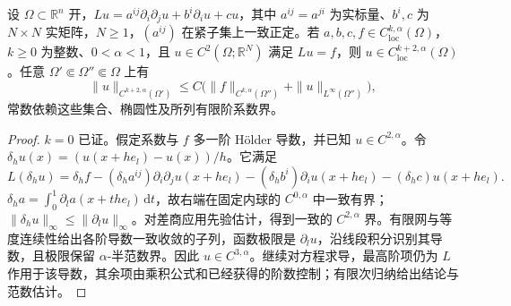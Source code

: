 \begin{corollary}\label{g3:cor:schauder-higher-bootstrap}
	设 \(\Omega\subset\mathbb R^n\) 开，\(Lu=a^{ij}\partial_i\partial_ju+b^i\partial_i u+cu\)，其中 \(a^{ij}=a^{ji}\) 为实标量、\(b^i,c\) 为 \(N\times N\) 实矩阵，\(N\ge1\)，\((a^{ij})\) 在紧子集上一致正定。若 \(a,b,c,f\in C^{k,\alpha}_{\mathrm{loc}}(\Omega)\)，\(k\ge0\) 为整数、\(0<\alpha<1\)，且 \(u\in C^2(\Omega;\mathbb R^N)\) 满足 \(Lu=f\)，则 \(u\in C^{k+2,\alpha}_{\mathrm{loc}}(\Omega)\)。任意 \(\Omega'\Subset\Omega''\Subset\Omega\) 上有
	\[
		\|u\|_{C^{k+2,\alpha}(\Omega')}
		\le C\bigl(\|f\|_{C^{k,\alpha}(\Omega'')}+\|u\|_{L^\infty(\Omega'')}\bigr),
	\]
	常数依赖这些集合、椭圆性及所列有限阶系数界。
\end{corollary}
\begin{proof}
	\(k=0\) 已证。假定系数与 \(f\) 多一阶 Hölder 导数，并已知 \(u\in C^{2,\alpha}\)。令 \(\delta_hu(x)=(u(x+he_l)-u(x))/h\)。它满足
	\[
		L(\delta_hu)=\delta_hf
		-(\delta_ha^{ij})\partial_i\partial_j u(x+he_l)
		-(\delta_hb^i)\partial_i u(x+he_l)
		-(\delta_hc)u(x+he_l).
	\]
	\(\delta_ha=\int_0^1\partial_la(x+the_l)\,\mathrm dt\)，故右端在固定内球的 \(C^{0,\alpha}\) 中一致有界；\(\|\delta_hu\|_\infty\le\|\partial_lu\|_\infty\)。对差商应用先验估计，得到一致的 \(C^{2,\alpha}\) 界。有限网与等度连续性给出各阶导数一致收敛的子列，函数极限是 \(\partial_lu\)，沿线段积分识别其导数，且极限保留 \(\alpha\)-半范数界。因此 \(u\in C^{3,\alpha}\)。继续对方程求导，最高阶项仍为 \(L\) 作用于该导数，其余项由乘积公式和已经获得的阶数控制；有限次归纳给出结论与范数估计。
\end{proof}

